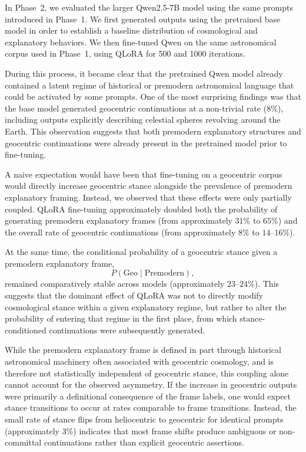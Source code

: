 In Phase~2, we evaluated the larger Qwen2.5-7B model using the same prompts introduced in Phase~1. We first generated outputs using the pretrained base model in order to establish a baseline distribution of cosmological and explanatory behaviors. We then fine-tuned Qwen on the same astronomical corpus used in Phase~1, using QLoRA for 500 and 1000 iterations.

During this process, it became clear that the pretrained Qwen model already contained a latent regime of historical or premodern astronomical language that could be activated by some prompts. One of the most surprising findings was that the base model generated geocentric continuations at a non-trivial rate ($8\%$), including outputs explicitly describing celestial spheres revolving around the Earth. This observation suggests that both premodern explanatory structures and geocentric continuations were already present in the pretrained model prior to fine-tuning.

A naive expectation would have been that fine-tuning on a geocentric corpus would directly increase geocentric stance alongside the prevalence of premodern explanatory framing. Instead, we observed that these effects were only partially coupled. QLoRA fine-tuning approximately doubled both the probability of generating premodern explanatory frames (from approximately $31\%$ to $65\%$) and the overall rate of geocentric continuations (from approximately $8\%$ to $14$--$16\%$). 

At the same time, the conditional probability of a geocentric stance given a premodern explanatory frame,
\[
P(\mathrm{Geo}\mid \mathrm{Premodern}),
\]
remained comparatively stable across models (approximately $23$--$24\%$). This suggests that the dominant effect of QLoRA was not to directly modify cosmological stance within a given explanatory regime, but rather to alter the probability of entering that regime in the first place, from which stance-conditioned continuations were subsequently generated.

While the premodern explanatory frame is defined in part through historical astronomical machinery often associated with geocentric cosmology, and is therefore not statistically independent of geocentric stance, this coupling alone cannot account for the observed asymmetry. If the increase in geocentric outputs were primarily a definitional consequence of the frame labels, one would expect stance transitions to occur at rates comparable to frame transitions. Instead, the small rate of stance flips from heliocentric to geocentric for identical prompts (approximately $3\%$) indicates that most frame shifts produce ambiguous or non-committal continuations rather than explicit geocentric assertions.

